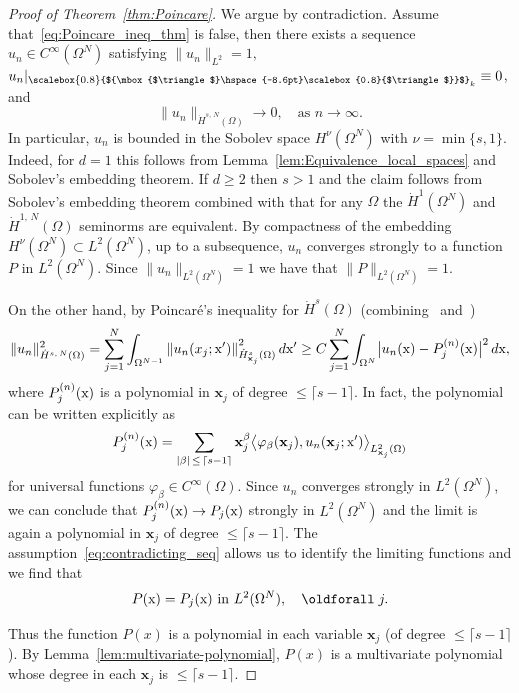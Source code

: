 \documentclass[10pt]{amsart}
\theoremstyle{definition}\newtheorem{defi}[theo]{Definition}\newtheorem{rema}[theo]{Remark}\newtheorem{exam}[theo]{Example}\newtheorem{exem}[theo]{Example}\newtheorem{nota}[theo]{Notation}
\newcommand\1{{\ensuremath {\mathds 1} }}
\newcommand{\bx}{\mathbf{x}}
\newcommand{\sx}{\textup{x}}
\newcommand{\bDelta}{{\mbox{$\triangle$}\hspace{-8.6pt}\scalebox{0.8}{$\triangle$}}}
\newcommand{\scriptbDelta}{\scalebox{0.8}{$\bDelta$}}
\renewcommand*{\forall}{\mathrel{\oldforall}}
\begin{document}
\begin{proof}[Proof of Theorem~\ref{thm:Poincare}]
We argue by contradiction. Assume that~\eqref{eq:Poincare_ineq_thm} is false, then there exists a sequence $u_n\in C^\infty(\Omega^N)$ satisfying $\|u_n\|_{L^2}=1,$ $u_n|_{\scriptbDelta_k}\equiv 0$, and
\begin{equation}\label{eq:contradicting_seq}
\|u_n\|_{\dot{H}^{s,\,N}(\Omega)}\to 0, \quad \text{as }n\to \infty.
\end{equation}
In particular, $u_n$ is bounded in the Sobolev space $H^{\nu}(\Omega^N)$ with $\nu=\min\{s, 1\}$. Indeed, for $d=1$ this follows from Lemma~\ref{lem:Equivalence_local_spaces} and Sobolev's embedding theorem. If $d\geq 2$ then $s>1$ and the claim follows from Sobolev's embedding theorem combined with that for any $\Omega$ the $\dot H^{1}(\Omega^N)$ and $\dot H^{1,\,N}(\Omega)$ seminorms are equivalent. By compactness of the embedding $H^\nu(\Omega^N) \subset L^2(\Omega^N)$, up to a subsequence, $u_n$ converges strongly to a function $P$ in $L^2(\Omega^N)$. Since $\|u_n\|_{L^2(\Omega^N)}=1$ we have that $\|P\|_{L^2(\Omega^N)}=1$.

On the other hand, by Poincaré's inequality for $\dot{H}^s(\Omega)$ (combining~\cite[Theorem~8.11]{LiebLoss_book} and~\cite[Lemma~2.2]{Hurri_etal_13})
\[
\|u_n\|_{\dot{H}^{s,\,N}(\Omega)}^2
=\sum_{j=1}^N \int_{\Omega^{N-1}}\left\|u_n(x_j; \sx')\right\|^2_{\dot{H}^s_{\bx_j}(\Omega)}d\sx'
\geq C\sum_{j=1}^N \int_{\Omega^{N}}\bigl|u_n(\sx)- P^{(n)}_j(\sx)\bigr|^2\,d\sx,
\]
where $P_j^{(n)}(\sx)$ is a polynomial in $\bx_j$ of degree $\leq \lceil s-1\rceil$. In fact, the polynomial can be written explicitly as
\begin{equation}
P_j^{(n)}(\sx) = \sum_{|\beta|\,\leq\,\lceil s-1\rceil} \bx_j^\beta \bigl\langle \varphi_\beta(\bx_j), u_n(\bx_j; \sx')\bigr\rangle_{L^2_{\bx_j}(\Omega)}
\end{equation}
for universal functions $\varphi_\beta\in C^\infty(\Omega)$. Since $u_n$ converges strongly in $L^2(\Omega^N)$, we can conclude that $P^{(n)}_j(\sx) \to P_j(\sx)$ strongly in $L^2(\Omega^N)$ and the limit is again a polynomial in $\bx_j$ of degree $\leq \lceil s-1\rceil$. The assumption~\eqref{eq:contradicting_seq} allows us to identify the limiting functions and we find that
\begin{equation*}
P(\sx)=P_j(\sx)\text{ in } L^2(\Omega^N), \quad \forall j.
\end{equation*}

Thus the function $P(x)$ is a polynomial in each variable $\bx_j$ (of degree $\leq \lceil s-1\rceil$). By Lemma~\ref{lem:multivariate-polynomial}, $P(x)$ is a multivariate polynomial whose degree in each $\bx_j$ is $\leq \lceil s-1\rceil$.



\end{proof}
\end{document}
